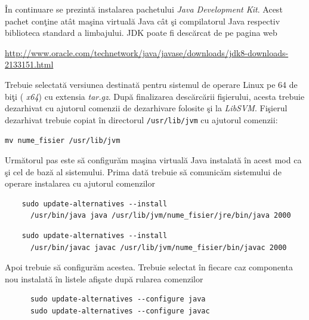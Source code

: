 \documentclass[a4paper,12pt]{report}
\begin{document}
  \par
  \^In continuare se prezint\u a instalarea pachetului \textit{Java Development Kit}. Acest pachet con\c tine at\^at 
  ma\c sina virtual\u a Java c\^at \c si compilatorul Java respectiv biblioteca standard a limbajului.
  JDK poate fi desc\u arcat de pe pagina web 
  
  \begin{center}
    \href{http://www.oracle.com/technetwork/java/javase/downloads/jdk8-downloads-2133151.html}
    {http://www.oracle.com/technetwork/java/javase/downloads/jdk8-downloads-2133151.html}
  \end{center}
  
  Trebuie selectat\u a versiunea destinat\u a pentru sistemul de operare Linux pe 64 de bi\c ti (
  \textit{x64}) cu extensia \textit{tar.gz}. Dup\u a finalizarea desc\u arc\u arii fi\c sierului, 
  acesta trebuie dezarhivat cu ajutorul comenzii de dezarhivare 
  folosite \c si la \textit{LibSVM}. Fi\c sierul dezarhivat trebuie copiat \^in directorul 
  \verb|/usr/lib/jvm| cu ajutorul comenzii:
  
  \begin{center}
    \verb|mv nume_fisier /usr/lib/jvm|
  \end{center}
  
  \par
  Urm\u atorul pas este s\u a configur\u am ma\c sina virtual\u a Java instalat\u a \^in acest mod
  ca \c si cel de baz\u a al sistemului.
  Prima dat\u a trebuie s\u a comunic\u am sistemului de operare instalarea cu ajutorul comenzilor
  
  \begin{center}
    \begin{verbatim}
	sudo update-alternatives --install 
	  /usr/bin/java java /usr/lib/jvm/nume_fisier/jre/bin/java 2000
    \end{verbatim}

    \begin{verbatim}
	sudo update-alternatives --install 
	  /usr/bin/javac javac /usr/lib/jvm/nume_fisier/bin/javac 2000
    \end{verbatim}
  \end{center}
  
  \par
  Apoi trebuie s\u a configur\u am acestea. Trebuie selectat \^in fiecare caz componenta nou instalat\u a 
  \^in listele afi\c sate dup\u a rularea comenzilor
  
  \begin{center}
    \begin{verbatim}
      sudo update-alternatives --configure java
      sudo update-alternatives --configure javac
    \end{verbatim}
  \end{center}
  
\end{document}

